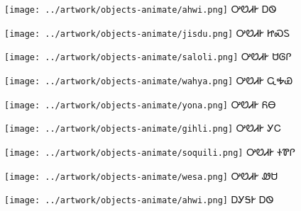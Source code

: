 \documentclass[avery5371,frame]{flashcards}%
\begin{document}
\begin{flashcard}{
\texttt{[image: ../artwork/objects-animate/ahwi.png]}
}\Huge ᎤᏬᏗᎨ ᎠᏫ
\end{flashcard}

\begin{flashcard}{
\texttt{[image: ../artwork/objects-animate/jisdu.png]}
}\Huge ᎤᏬᏗᎨ ᏥᏍᏚ
\end{flashcard}

\begin{flashcard}{
\texttt{[image: ../artwork/objects-animate/saloli.png]}
}\Huge ᎤᏬᏗᎨ ᏌᎶᎵ
\end{flashcard}

\begin{flashcard}{
\texttt{[image: ../artwork/objects-animate/wahya.png]}
}\Huge ᎤᏬᏗᎨ ᏩᎭᏯ
\end{flashcard}

\begin{flashcard}{
\texttt{[image: ../artwork/objects-animate/yona.png]}
}\Huge ᎤᏬᏗᎨ ᏲᎾ
\end{flashcard}

\begin{flashcard}{
\texttt{[image: ../artwork/objects-animate/gihli.png]}
}\Huge ᎤᏬᏗᎨ ᎩᏟ
\end{flashcard}

\begin{flashcard}{
\texttt{[image: ../artwork/objects-animate/soquili.png]}
}\Huge ᎤᏬᏗᎨ ᏐᏈᎵ
\end{flashcard}

\begin{flashcard}{
\texttt{[image: ../artwork/objects-animate/wesa.png]}
}\Huge ᎤᏬᏗᎨ ᏪᏌ
\end{flashcard}

\begin{flashcard}{
\texttt{[image: ../artwork/objects-animate/ahwi.png]}
}\Huge ᎠᎩᎦᎨ ᎠᏫ
\end{flashcard}
\end{document}
